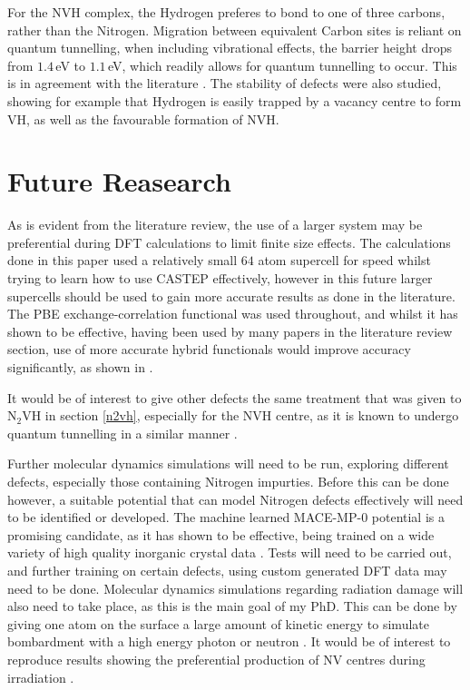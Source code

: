 \documentclass[10pt,a4paper,twocolumn,twoside]{extarticle}
\newcommand{\ntvh}{N$_2$VH}
\begin{document}
For the NVH complex, the Hydrogen preferes to bond to one of three carbons, rather than the Nitrogen. Migration between equivalent Carbon sites is reliant on quantum tunnelling, when including vibrational effects, the barrier height drops from $1.4$\,eV to $1.1$\,eV, which readily allows for quantum tunnelling to occur. This is in agreement with the literature \cite{Shaw_QT_VH}.
The stability of defects were also studied, showing for example that Hydrogen is easily trapped by a vacancy centre to form VH, as well as the favourable formation of NVH. 

\section{Future Reasearch}
\label{sec:future}
As is evident from the literature review, the use of a larger system may be preferential during DFT calculations to limit finite size effects. The calculations done in this paper used a relatively small $64$ atom supercell for speed whilst trying to learn how to use CASTEP effectively, however in this future larger supercells should be used to gain more accurate results as done in the literature.
The PBE exchange-correlation functional was used throughout, and whilst it has shown to be effective, having been used by many papers in the literature review section, use of more accurate hybrid functionals would improve accuracy significantly, as shown in \cite{Deak}. 

It would be of interest to give other defects the same treatment that was given to {\ntvh} in section \ref{n2vh}, especially for the NVH centre, as it is known to undergo quantum tunnelling in a similar manner \cite{Peaker,Shaw_QT_VH}.  

Further molecular dynamics simulations will need to be run, exploring different defects, especially those containing Nitrogen impurties. Before this can be done however, a suitable potential that can model Nitrogen defects effectively will need to be identified or developed. The machine learned MACE-MP-0 potential is a promising candidate, as it has shown to be effective, being trained on a wide variety of high quality inorganic crystal data \cite{MACE}. Tests will need to be carried out, and further training on certain defects, using custom generated DFT data may need to be done. Molecular dynamics simulations regarding radiation damage will also need to take place, as this is the main goal of my PhD. This can be done by giving one atom on the surface a large amount of kinetic energy to simulate bombardment with a high energy photon or neutron \cite{radiation}. It would be of interest to reproduce results showing the preferential production of NV centres during irradiation \cite{Deak}. %

\printbibliography
\end{document}

